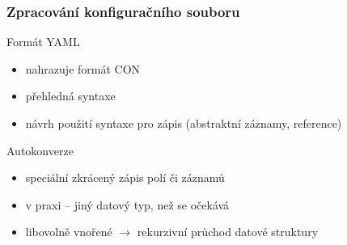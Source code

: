 \begin{frame}[fragile]
	\frametitle{Zpracování konfiguračního souboru}
	\begin{minipage}[t]{0.45\textwidth}
	\begin{block}{Formát YAML}
	\begin{itemize}
		\item<3-> nahrazuje formát CON
		\item<4-> přehledná syntaxe
		\item<5-> návrh použití syntaxe pro zápis (abstraktní záznamy, reference)
	\end{itemize}
	\end{block}
	\end{minipage}
	\hspace{5pt}
	\begin{minipage}[t]{0.45\textwidth}
	\begin{block}{Autokonverze}
	\begin{itemize}
		\item<7-> speciální zkrácený zápis polí či záznamů
		\item<8-> v praxi -- jiný datový typ, než se očekává
		\item<9-> libovolně vnořené $\rightarrow$ rekurzivní průchod datové struktury
	\end{itemize}
	\end{block}
	\end{minipage}
\end{frame}

